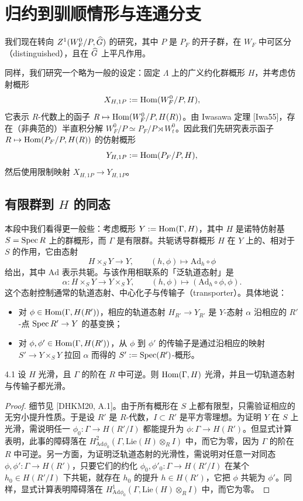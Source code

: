 \section{归约到驯顺情形与连通分支}

我们现在转向 $Z^1(W^0_F/P,\widehat{G})$ 的研究，其中 $P$ 是 $P_F$ 的开子群，在 $W_F$ 中可区分（distinguished），且在 $\widehat{G}$ 上平凡作用。

同样，我们研究一个略为一般的设定：固定 $\Lambda$ 上的广义约化群概形 $H$，并考虑仿射概形
\[
X_{H,1P}:=\operatorname{Hom}(W^0_F/P,H),
\]
它表示 $R$-代数上的函子 $R\mapsto\operatorname{Hom}(W^0_F/P,H(R))$。由 Iwasawa 定理 [Iwa55]，存在（非典范的）半直积分解 $W^0_F/P\simeq P_F/P\rtimes W^0_t$。因此我们先研究表示函子 $R\mapsto\operatorname{Hom}(P_F/P,H(R))$ 的仿射概形
\[
Y_{H,1P}:=\operatorname{Hom}(P_F/P,H),
\]
然后使用限制映射 $X_{H,1P}\to Y_{H,1P}$。

\subsection{有限群到 $H$ 的同态}

本段中我们看得更一般些：考虑概形 $Y:=\operatorname{Hom}(\Gamma,H)$，其中 $H$ 是诺特仿射基 $S=\operatorname{Spec} R$ 上的群概形，而 $\Gamma$ 是有限群。共轭诱导群概形 $H$ 在 $Y$ 上的、相对于 $S$ 的作用，它由态射
\[
H\times_S Y\longrightarrow Y,\qquad (h,\phi)\mapsto \mathrm{Ad}_h\circ\phi
\]
给出，其中 $\mathrm{Ad}$ 表示共轭。与该作用相联系的「泛轨道态射」是
\[
\alpha:H\times_S Y\longrightarrow Y\times_S Y,\qquad (h,\phi)\mapsto(\mathrm{Ad}_h\circ\phi,\phi).
\]
这个态射控制通常的轨道态射、中心化子与传输子（transporter）。具体地说：

\begin{itemize}[leftmargin=1.6em,itemsep=0.2em]
\item 对 $\phi\in\operatorname{Hom}(\Gamma,H(R'))$，相应的轨道态射 $H_{R'}\to Y_{R'}$ 是 $Y$-态射 $\alpha$ 沿相应的 $R'$-点 $\operatorname{Spec} R'\to Y$ 的基变换；
\item 对 $\phi,\phi'\in\operatorname{Hom}(\Gamma,H(R'))$，从 $\phi$ 到 $\phi'$ 的传输子是通过沿相应的映射 $S'\to Y\times_S Y$ 拉回 $\alpha$ 而得的 $S':=\operatorname{Spec}(R')$-概形。
\end{itemize}

\begin{lem}{4.1}\label{lem:dat-4-1}
设 $H$ 光滑，且 $\Gamma$ 的阶在 $R$ 中可逆。则 $\operatorname{Hom}(\Gamma,H)$ 光滑，并且一切轨道态射与传输子都光滑。
\end{lem}

\begin{proof}
细节见 [DHKM20, A.1]。由于所有概形在 $S$ 上都有限型，只需验证相应的无穷小提升性质。于是设 $R'$ 是 $R$-代数，$I\subset R'$ 是平方零理想。为证明 $Y$ 在 $S$ 上光滑，需说明任一 $\phi_0:\Gamma\to H(R'/I)$ 都能提升为 $\phi:\Gamma\to H(R')$。但显式计算表明，此事的障碍落在 $H^2_{\mathrm{Ad}\phi_0}(\Gamma,\mathrm{Lie}(H)\otimes_R I)$ 中，而它为零，因为 $\Gamma$ 的阶在 $R$ 中可逆。另一方面，为证明泛轨道态射的光滑性，需说明对任意一对同态 $\phi,\phi':\Gamma\to H(R')$，只要它们的约化
$\phi_0,\phi'_0:\Gamma\to H(R'/I)$ 在某个 $h_0\in H(R'/I)$ 下共轭，就存在 $h_0$ 的提升 $h\in H(R')$，它把 $\phi$ 共轭为 $\phi'$。同样，显式计算表明障碍落在 $H^1_{\mathrm{Ad}\phi_0}(\Gamma,\mathrm{Lie}(H)\otimes_R I)$ 中，而它为零。
\end{proof}

